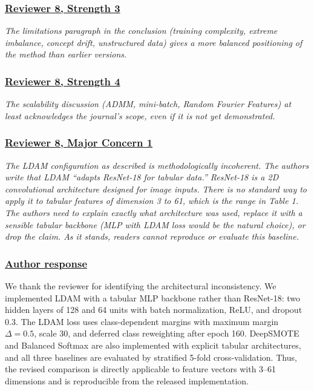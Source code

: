 \documentclass[journal,12pt, onecolumn]{IEEEtran}
\begin{document}
{\color{customgreen}
\subsubsection*{\underline{\textbf{Reviewer 8, Strength 3}}}
\emph{The limitations paragraph in the conclusion (training complexity, extreme imbalance, concept drift, unstructured data) gives a more balanced positioning of the method than earlier versions.}
}


{\color{customgreen}
\subsubsection*{\underline{\textbf{Reviewer 8, Strength 4}}}
\emph{The scalability discussion (ADMM, mini-batch, Random Fourier Features) at least acknowledges the journal's scope, even if it is not yet demonstrated.}
}


{\color{customgreen}
\subsubsection*{\underline{\textbf{Reviewer 8, Major Concern 1}}}
\emph{The LDAM configuration as described is methodologically incoherent. The authors write that LDAM ``adapts ResNet-18 for tabular data.'' ResNet-18 is a 2D convolutional architecture designed for image inputs. There is no standard way to apply it to tabular features of dimension 3 to 61, which is the range in Table 1. The authors need to explain exactly what architecture was used, replace it with a sensible tabular backbone (MLP with LDAM loss would be the natural choice), or drop the claim. As it stands, readers cannot reproduce or evaluate this baseline.}
}


{\color{black}
\subsubsection*{\textbf{\underline{Author response}}}
We thank the reviewer for identifying the architectural inconsistency. We implemented LDAM with a tabular MLP backbone rather than ResNet-18: two hidden layers of 128 and 64 units with batch normalization, ReLU, and dropout 0.3. The LDAM loss uses class-dependent margins with maximum margin $\Delta=0.5$, scale 30, and deferred class reweighting after epoch 160. DeepSMOTE and Balanced Softmax are also implemented with explicit tabular architectures, and all three baselines are evaluated by stratified 5-fold cross-validation. Thus, the revised comparison is directly applicable to feature vectors with 3--61 dimensions and is reproducible from the released implementation.
}
\end{document}
